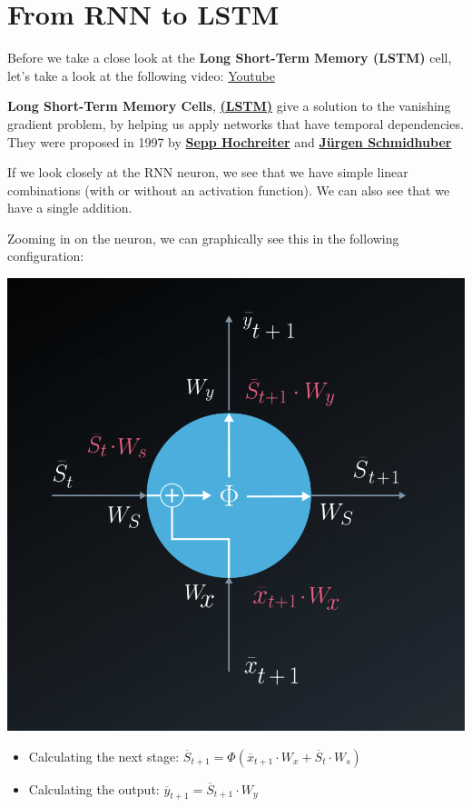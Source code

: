 \section{From RNN to LSTM}

Before we take a close look at the \textbf{Long Short-Term Memory (LSTM)} cell, let's take a look at the following video: \href{https://www.youtube.com/watch?v=MsqybcWmzGY&ab_channel=Udacity}{Youtube} \newline

\textbf{Long Short-Term Memory Cells}, \href{http://www.bioinf.jku.at/publications/older/2604.pdf}{\textbf{(LSTM)}} give a solution to the vanishing gradient problem, by helping us apply networks that have temporal dependencies. They were proposed in 1997 by \href{https://en.wikipedia.org/wiki/Sepp_Hochreiter}{\textbf{Sepp Hochreiter}} and \href{http://people.idsia.ch/~juergen/}{\textbf{Jürgen Schmidhuber}} \newline

If we look closely at the RNN neuron, we see that we have simple linear combinations (with or without an activation function). We can also see that we have a single addition. \newline

Zooming in on the neuron, we can graphically see this in the following configuration:

\includegraphics[width=0.5\linewidth]{img//rnn//lstm/screen-shot-2017-11-27-at-3.46.35-pm.png}

\begin{itemize}
    \item Calculating the next stage: \(\overline{S}_{t+1} = \Phi (\overline{x}_{t+1} \cdot W_x + \overline{S}_t \cdot W_s)\)
    \item Calculating the output: \(\overline{y}_{t+1} = \overline{S}_{t+1} \cdot W_y\)
\end{itemize}

